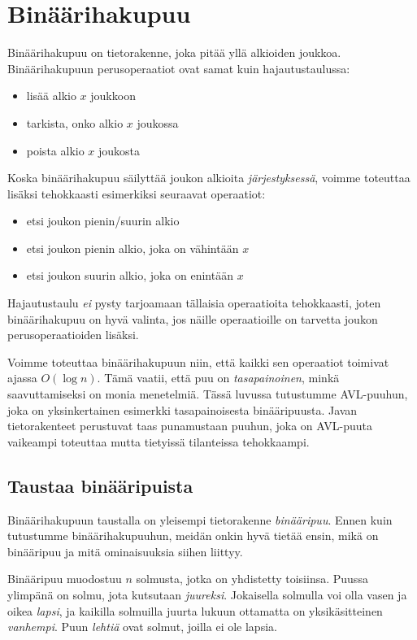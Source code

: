 \chapter{Binäärihakupuu}

Binäärihakupuu on tietorakenne, joka pitää yllä alkioiden joukkoa.
Binääri\-hakupuun perusoperaatiot ovat samat kuin hajautustaulussa:

\begin{itemize}
\item lisää alkio $x$ joukkoon
\item tarkista, onko alkio $x$ joukossa
\item poista alkio $x$ joukosta
\end{itemize}

Koska binäärihakupuu säilyttää joukon alkioita
\emph{järjestyksessä}, voimme toteuttaa lisäksi tehokkaasti
esimerkiksi seuraavat operaatiot:

\begin{itemize}
\item etsi joukon pienin/suurin alkio
\item etsi joukon pienin alkio, joka on vähintään $x$
\item etsi joukon suurin alkio, joka on enintään $x$
\end{itemize}

Hajautustaulu \emph{ei} pysty tarjoamaan tällaisia operaatioita
tehokkaasti, joten binäärihakupuu on hyvä valinta, jos näille
operaatioille on tarvetta joukon perusoperaatioiden lisäksi.

Voimme toteuttaa binäärihakupuun niin,
että kaikki sen operaatiot toimivat ajassa $O(\log n)$.
Tämä vaatii, että puu on \emph{tasapainoinen},
minkä saavuttamiseksi on monia menetelmiä.
Tässä luvussa tutustumme AVL-puuhun, joka on
yksinkertainen esimerkki tasapainoisesta binääripuusta.
Javan tietorakenteet perustuvat taas punamustaan puuhun,
joka on AVL-puuta vaikeampi toteuttaa mutta tietyissä tilanteissa tehokkaampi.

\section{Taustaa binääripuista}

Binäärihakupuun taustalla on yleisempi tietorakenne \emph{binääripuu}.
Ennen kuin tutustumme binäärihakupuuhun,
meidän onkin hyvä tietää ensin, mikä on binääripuu ja mitä
ominaisuuksia siihen liittyy.

Binääripuu muodostuu $n$ solmusta, jotka on yhdistetty toisiinsa.
Puussa ylimpänä on solmu, jota kutsutaan \emph{juureksi}.
Jokaisella solmulla voi olla vasen ja oikea \emph{lapsi},
ja kaikilla solmuilla juurta lukuun ottamatta on yksikäsitteinen \emph{vanhempi}.
Puun \emph{lehtiä} ovat solmut, joilla ei ole lapsia.

